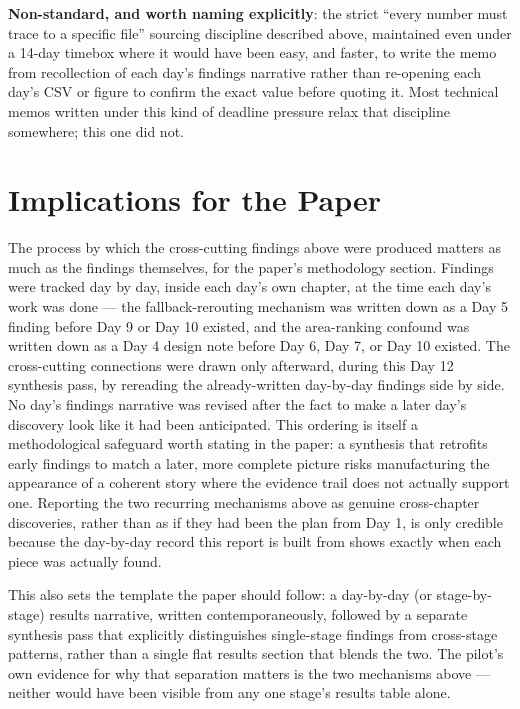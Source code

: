 \textbf{Non-standard, and worth naming explicitly}: the strict ``every number must trace to a
specific file'' sourcing discipline described above, maintained even under a 14-day timebox
where it would have been easy, and faster, to write the memo from recollection of each day's
findings narrative rather than re-opening each day's CSV or figure to confirm the exact value
before quoting it. Most technical memos written under this kind of deadline pressure relax that
discipline somewhere; this one did not.

\section{Implications for the Paper}

The process by which the cross-cutting findings above were produced matters as much as the
findings themselves, for the paper's methodology section.
Findings were tracked day by day, inside each day's own chapter, at the time each day's work was
done --- the fallback-rerouting mechanism was written down as a Day 5 finding before Day 9 or
Day 10 existed, and the area-ranking confound was written down as a Day 4 design note before
Day 6, Day 7, or Day 10 existed. The cross-cutting connections were drawn only afterward, during
this Day 12 synthesis pass, by rereading the already-written day-by-day findings side by side.
No day's findings narrative was revised after the fact to make a later day's discovery look like
it had been anticipated. This ordering is itself a methodological safeguard worth stating in the
paper: a synthesis that retrofits early findings to match a later, more complete picture risks
manufacturing the appearance of a coherent story where the evidence trail does not actually
support one. Reporting the two recurring mechanisms above as genuine cross-chapter discoveries,
rather than as if they had been the plan from Day 1, is only credible because the day-by-day
record this report is built from shows exactly when each piece was actually found.

This also sets the template the paper should follow: a day-by-day (or stage-by-stage) results
narrative, written contemporaneously, followed by a separate synthesis pass that explicitly
distinguishes single-stage findings from cross-stage patterns, rather than a single flat results
section that blends the two. The pilot's own evidence for why that separation matters is the two
mechanisms above --- neither would have been visible from any one stage's results table alone.
